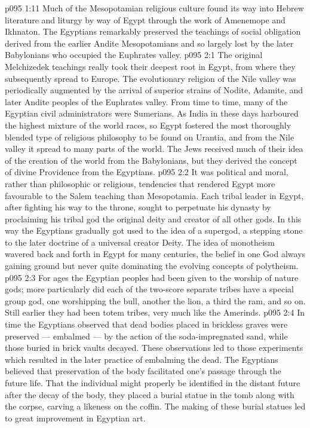 \vs p095 1:11 Much of the Mesopotamian religious culture found its way into Hebrew literature and liturgy by way of Egypt through the work of Amenemope and Ikhnaton. The Egyptians remarkably preserved the teachings of social obligation derived from the earlier Andite Mesopotamians and so largely lost by the later Babylonians who occupied the Euphrates valley.
\vs p095 2:1 The original Melchizedek teachings really took their deepest root in Egypt, from where they subsequently spread to Europe. The evolutionary religion of the Nile valley was periodically augmented by the arrival of superior strains of Nodite, Adamite, and later Andite peoples of the Euphrates valley. From time to time, many of the Egyptian civil administrators were Sumerians. As India in these days harboured the highest mixture of the world races, so Egypt fostered the most thoroughly blended type of religious philosophy to be found on Urantia, and from the Nile valley it spread to many parts of the world. The Jews received much of their idea of the creation of the world from the Babylonians, but they derived the concept of divine Providence from the Egyptians.
\vs p095 2:2 It was political and moral, rather than philosophic or religious, tendencies that rendered Egypt more favourable to the Salem teaching than Mesopotamia. Each tribal leader in Egypt, after fighting his way to the throne, sought to perpetuate his dynasty by proclaiming his tribal god the original deity and creator of all other gods. In this way the Egyptians gradually got used to the idea of a supergod, a stepping stone to the later doctrine of a universal creator Deity. The idea of monotheism wavered back and forth in Egypt for many centuries, the belief in one God always gaining ground but never quite dominating the evolving concepts of polytheism.
\vs p095 2:3 For ages the Egyptian peoples had been given to the worship of nature gods; more particularly did each of the two\hyp{}score separate tribes have a special group god, one worshipping the bull, another the lion, a third the ram, and so on. Still earlier they had been totem tribes, very much like the Amerinds.
\vs p095 2:4 \pc In time the Egyptians observed that dead bodies placed in brickless graves were preserved --- embalmed --- by the action of the soda\hyp{}impregnated sand, while those buried in brick vaults decayed. These observations led to those experiments which resulted in the later practice of embalming the dead. The Egyptians believed that preservation of the body facilitated one’s passage through the future life. That the individual might properly be identified in the distant future after the decay of the body, they placed a burial statue in the tomb along with the corpse, carving a likeness on the coffin. The making of these burial statues led to great improvement in Egyptian art.
